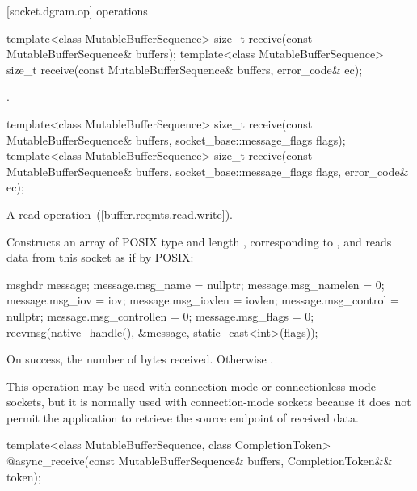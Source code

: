 [socket.dgram.op]{ operations}

\begin{itemdecl}
template<class MutableBufferSequence>
  size_t receive(const MutableBufferSequence& buffers);
template<class MutableBufferSequence>
  size_t receive(const MutableBufferSequence& buffers,
                 error_code& ec);
\end{itemdecl}

\begin{itemdescr}
\pnum
\returns {}.
\end{itemdescr}

\begin{itemdecl}
template<class MutableBufferSequence>
  size_t receive(const MutableBufferSequence& buffers,
                 socket_base::message_flags flags);
template<class MutableBufferSequence>
  size_t receive(const MutableBufferSequence& buffers,
                 socket_base::message_flags flags, error_code& ec);
\end{itemdecl}

\begin{itemdescr}
\pnum
A read operation~(\ref{buffer.reqmts.read.write}).

\pnum
\effects Constructs an array  of POSIX type  and length , corresponding to , and reads data from this socket as if by POSIX:
\begin{codeblock}
msghdr message;
message.msg_name = nullptr;
message.msg_namelen = 0;
message.msg_iov = iov;
message.msg_iovlen = iovlen;
message.msg_control = nullptr;
message.msg_controllen = 0;
message.msg_flags = 0;
recvmsg(native_handle(), &message, static_cast<int>(flags));
\end{codeblock}


\pnum
\returns On success, the number of bytes received. Otherwise .

\pnum
 \begin{note} This operation may be used with connection-mode or connectionless-mode sockets, but it is normally used with connection-mode sockets because it does not permit the application to retrieve the source endpoint of received data. \end{note}
\end{itemdescr}

\begin{itemdecl}
template<class MutableBufferSequence, class CompletionToken>
  @\DEDUCED@ async_receive(const MutableBufferSequence& buffers,
                        CompletionToken&& token);
\end{itemdecl}


